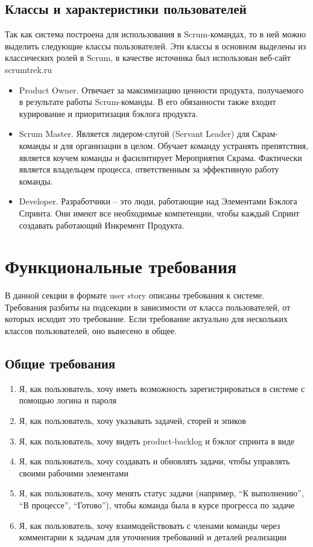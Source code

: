 \documentclass{article}
\begin{document}
\subsection{Классы и характеристики пользователей}
Так как система построена для использования в Scrum-командах, то в ней
можно выделить следующие классы пользователей. Эти классы в основном выделены из
классических ролей в Scrum, в качестве источника был использован веб-сайт scrumtrek.ru
\begin{itemize}
\item Product Owner. Отвечает за максимизацию ценности продукта, получаемого в результате работы Scrum-команды.
В его обязанности также входит курирование и приоритизация бэклога продукта.
\item Scrum Master. Является лидером-слугой (Servant Leader) для Скрам-команды и для организации в целом.
Обучает команду устранять препятствия, является коучем команды и фасилитирует Мероприятия Скрама.
Фактически является владельцем процесса, ответственным за эффективную работу команды.
\item Developer. Разработчики -- это люди, работающие над Элементами Бэклога Спринта.
Они имеют все необходимые компетенции, чтобы каждый Спринт создавать работающий Инкремент Продукта.
\end{itemize}

\section{Функциональные требования}

В данной секции в формате user story описаны требования к системе.
Требования разбиты на подсекции в зависимости от класса пользователей,
от которых исходит это требование.
Если требование актуально для нескольких классов пользователей, оно
вынесено в общее.

\subsection{Общие требования}
\begin{enumerate}[label=\textbf{FR\arabic*}.]
  \item Я, как пользователь, хочу иметь возможность зарегистрироваться в системе с помощью логина и пароля
  \item Я, как пользователь, хочу указывать  задачей, сторей и эпиков
  \item Я, как пользователь, хочу видеть \Gls{product-backlog} и бэклог спринта в виде 
  \item Я, как пользователь, хочу создавать и обновлять задачи, чтобы управлять своими рабочими элементами
  \item Я, как пользователь, хочу менять статус задачи (например, ``К выполнению'', ``В процессе'', ``Готово''), чтобы команда была в курсе прогресса по задаче
  \item Я, как пользователь, хочу взаимодействовать с членами команды через комментарии к задачам для уточнения требований и деталей реализации
\end{enumerate}
\end{document}
